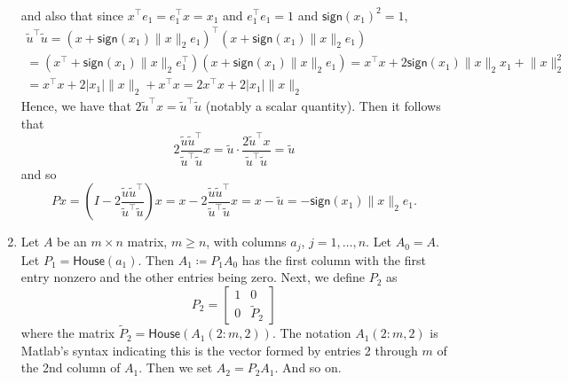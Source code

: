 \documentclass{../../../kin_math}
\begin{document}
\begin{questions}
\begin{enumerate}
\begin{solution}
\begin{multline*}
      \end{multline*}
      and also that since $x^\top e_1 = e_1^\top x = x_1$ and $e_1^\top e_1 = 1$ and $\textsf{sign}(x_1)^2 = 1$,
      \begin{multline*}
        \tilde{u}^\top \tilde{u} = (x + \textsf{sign}(x_1) \lVert x \rVert_2 e_1)^\top (x + \textsf{sign}(x_1) \lVert x \rVert_2 e_1) \\
        = (x^\top + \textsf{sign}(x_1) \lVert x \rVert_2 e_1^\top) (x + \textsf{sign}(x_1) \lVert x \rVert_2 e_1) = x^\top x + 2 \textsf{sign}(x_1) \lVert x \rVert_2 x_1 + \lVert x \rVert_2^2 \\
        = x^\top x + 2 |x_1| \lVert x \rVert_2 + x^\top x = 2x^\top x + 2 |x_1| \lVert x \rVert_2
      \end{multline*}
      Hence, we have that $2 \tilde{u}^\top x = \tilde{u}^\top \tilde{u}$ (notably a scalar quantity). Then it follows that
      \begin{equation*}
        2 \frac{\tilde{u} \tilde{u}^\top}{\tilde{u}^\top \tilde{u}} x = \tilde{u} \cdot \frac{2 \tilde{u}^\top x}{\tilde{u}^\top \tilde{u}} = \tilde{u}
      \end{equation*}
      and so
      \begin{equation*}
        Px = \left(I - 2 \frac{\tilde{u} \tilde{u}^\top}{\tilde{u}^\top \tilde{u}}\right)x = x - 2 \frac{\tilde{u} \tilde{u}^\top}{\tilde{u}^\top \tilde{u}}x = x - \tilde{u} = -\textsf{sign}(x_1) \lVert x \rVert_2 e_1.
      \end{equation*}
    \end{solution}
    \item Let $A$ be an $m \times n$ matrix, $m \geq n$, with columns $a_j$, $j = 1, \dots, n$. Let $A_0 = A$. Let $P_1 = \textsf{House}(a_1)$. Then $A_1 \coloneqq P_1A_0$ has the first column with the first entry nonzero and the other entries being zero. Next, we define $P_2$ as
    \begin{equation*}
      P_2 = \begin{bmatrix} 1 & 0 \\ 0 & \tilde{P}_2 \end{bmatrix}
    \end{equation*}
    where the matrix $\tilde{P}_2 = \textsf{House}(A_1(2 : m, 2))$. The notation $A_1(2 : m, 2)$ is Matlab's syntax indicating this is the vector formed by entries 2 through $m$ of the 2nd column of $A_1$. Then we set $A_2 = P_2A_1$. And so on.


\end{enumerate}
\end{questions}
\end{document}
